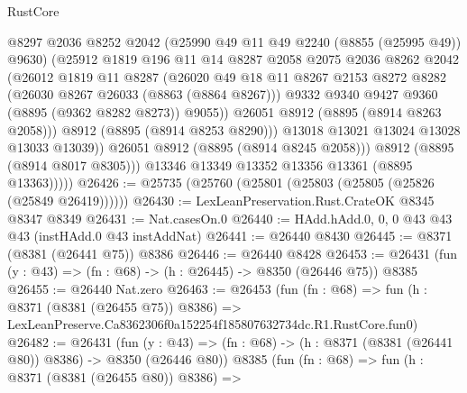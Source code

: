\begin{lexlean}{RustCore}
\begin{coremodule}
                      @8297
                      @2036
                      @8252
                      @2042
                      (@25990 @49 @11 @49 @2240 (@8855 (@25995 @49)) @9630)
                      (@25912
                        @1819
                        @196
                        @11
                        @14
                        @8287
                        @2058
                        @2075
                        @2036
                        @8262
                        @2042
                        (@26012
                          @1819
                          @11
                          @8287
                          (@26020
                            @49
                            @18
                            @11
                            @8267
                            @2153
                            @8272
                            @8282
                            (@26030 @8267 @26033 (@8863 (@8864 @8267)))
                            @9332
                            @9340
                            @9427
                            @9360
                            (@8895 (@9362 @8282 @8273))
                            @9055))
                        @26051
                        @8912
                        (@8895 (@8914 @8263 @2058)))
                      @8912
                      (@8895 (@8914 @8253 @8290)))
                    @13018
                    @13021
                    @13024
                    @13028
                    @13033
                    @13039))
                @26051
                @8912
                (@8895 (@8914 @8245 @2058)))
              @8912
              (@8895 (@8914 @8017 @8305)))
            @13346
            @13349
            @13352
            @13356
            @13361
            (@8895 @13363)))))
@26426 := @25735 (@25760 (@25801 (@25803 (@25805 (@25826 (@25849 @26419))))))
@26430 := LexLeanPreservation.Rust.CrateOK @8345 @8347 @8349
@26431 := Nat.casesOn.{0}
@26440 := HAdd.hAdd.{0, 0, 0} @43 @43 @43 (instHAdd.{0} @43 instAddNat)
@26441 := @26440 @8430
@26445 := @8371 (@8381 (@26441 @75)) @8386
@26446 := @26440 @8428
@26453 := @26431 (fun (y : @43) => (fn : @68) -> (h : @26445) -> @8350 (@26446 @75)) @8385
@26455 := @26440 Nat.zero
@26463 := @26453
    (fun (fn : @68) =>
    fun (h : @8371 (@8381 (@26455 @75)) @8386) =>
    LexLeanPreserve.Ca8362306f0a152254f185807632734dc.R1.RustCore.fun0)
@26482 := @26431
    (fun (y : @43) => (fn : @68) -> (h : @8371 (@8381 (@26441 @80)) @8386) -> @8350 (@26446 @80))
    @8385
    (fun (fn : @68) =>
    fun (h : @8371 (@8381 (@26455 @80)) @8386) =>

\end{coremodule}
\end{lexlean}
